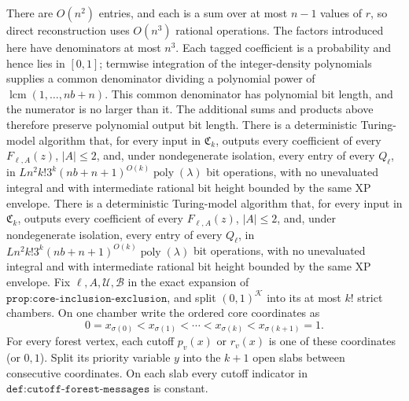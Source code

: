 There are \(O(n^2)\) entries, and each is a sum over at most \(n-1\) values of \(r\), so direct reconstruction uses \(O(n^3)\) rational operations.  The factors introduced here have denominators at most \(n^3\).  Each tagged coefficient is a probability and hence lies in \([0,1]\); termwise integration of the integer-density polynomials supplies a common denominator dividing a polynomial power of \(\operatorname{lcm}(1,\ldots,nb+n)\).  This common denominator has polynomial bit length, and the numerator is no larger than it.  The additional sums and products above therefore preserve polynomial output bit length.
There is a deterministic Turing-model algorithm that, for every input in \(\mathfrak C_k\), outputs every coefficient of every \(F_{\ell,A}(z)\), \(|A|\le2\), and, under nondegenerate isolation, every entry of every \(Q_\ell\), in \(Ln^2k!3^k(nb+n+1)^{O(k)}\operatorname{poly}(\lambda)\) bit operations, with no unevaluated integral and with intermediate rational bit height bounded by the same XP envelope.
There is a deterministic Turing-model algorithm that, for every input in \(\mathfrak C_k\), outputs every coefficient of every \(F_{\ell,A}(z)\), \(|A|\le2\), and, under nondegenerate isolation, every entry of every \(Q_\ell\), in \(Ln^2k!3^k(nb+n+1)^{O(k)}\operatorname{poly}(\lambda)\) bit operations, with no unevaluated integral and with intermediate rational bit height bounded by the same XP envelope.
Fix \(\ell,A,\mathcal U,\mathcal B\) in the exact expansion of \(\texttt{prop:core-inclusion-exclusion}\), and split \((0,1)^{\mathcal K}\) into its at most \(k!\) strict chambers.  On one chamber write the ordered core coordinates as
\[
 0=x_{\sigma(0)}<x_{\sigma(1)}<\cdots<x_{\sigma(k)}<x_{\sigma(k+1)}=1.
\]
For every forest vertex, each cutoff \(p_v(x)\) or \(r_v(x)\) is one of these coordinates (or \(0,1\)).  Split its priority variable \(y\) into the \(k+1\) open slabs between consecutive coordinates.  On each slab every cutoff indicator in \(\texttt{def:cutoff-forest-messages}\) is constant.

